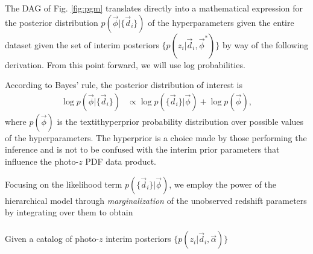 \documentclass[iop]{emulateapj}
\begin{document}

The DAG of Fig. \ref{fig:pgm} translates directly into a mathematical expression for the posterior distribution $p(\vec{\phi} | \{\vec{d}_{i}\})$ of the hyperparameters given the entire dataset given the set of interim posteriors $\{p(z_{i} | \vec{d}_{i}, \vec{\phi}^{*})\}$ by way of the following derivation.  From this point forward, we will use log probabilities.

According to Bayes' rule, the posterior distribution of interest is
\begin{align}
\log p(\vec{\phi} | \{\vec{d}_{i}\}) &\propto \log p(\{\vec{d}_{i}\} | \vec{\phi}) + \log p(\vec{\phi}),
\end{align}
where $p(\vec{\phi})$ is the textit{hyperprior} probability distribution over possible values of the hyperparameters.  The hyperprior is a choice made by those performing the inference and is not to be confused with the interim prior parameters that influence the photo-$z$ PDF data product.

Focusing on the likelihood term $p(\{\vec{d}_{i}\} | \vec{\phi})$, we employ the power of the hierarchical model through \textit{marginalization} of the unobserved redshift parameters by integrating over them to obtain 
\begin{align}
\end{align}


Given a catalog of photo-$z$ interim posteriors $\{p(z_{i} | \vec{d}_{i}, \vec{\alpha})\}$
\end{document}
